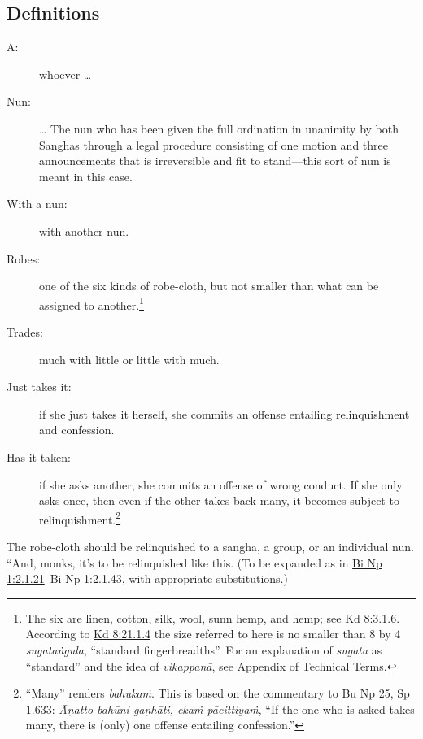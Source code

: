 \documentclass[12pt,openany]{book}%
\begin{document}
\subsection*{Definitions }

\begin{description}%
\item[A: ] whoever … %
\item[Nun: ] … The nun who has been given the full ordination in unanimity by both Sanghas through a legal procedure consisting of one motion and three announcements that is irreversible and fit to stand—this sort of nun is meant in this case. %
\item[With a nun: ] with another nun. %
\item[Robes: ] one of the six kinds of robe-cloth, but not smaller than what can be assigned to another.\footnote{The six are linen, cotton, silk, wool, sunn hemp, and hemp; see \href{https://suttacentral.net/pli-tv-kd8/en/brahmali\#3.1.6}{Kd 8:3.1.6}. According to \href{https://suttacentral.net/pli-tv-kd8/en/brahmali\#21.1.4}{Kd 8:21.1.4} the size referred to here is no smaller than 8 by 4 \textit{\textsanskrit{sugataṅgula}}, “standard fingerbreadths”. For an explanation of \textit{sugata} as “standard” and the idea of \textit{\textsanskrit{vikappanā}}, see Appendix of Technical Terms. } %
\item[Trades: ] much with little or little with much. %
\item[Just takes it: ] if she just takes it herself, she commits an offense entailing relinquishment and confession. %
\item[Has it taken: ] if she asks another, she commits an offense of wrong conduct. If she only asks once, then even if the other takes back many, it becomes subject to relinquishment.\footnote{“Many” renders \textit{\textsanskrit{bahukaṁ}}. This is based on the commentary to Bu Np 25, Sp 1.633: \textit{\textsanskrit{Āṇatto} \textsanskrit{bahūni} \textsanskrit{gaṇhāti}, \textsanskrit{ekaṁ} \textsanskrit{pācittiyaṁ}}, “If the one who is asked takes many, there is (only) one offense entailing confession.” } %
\end{description}

The robe-cloth should be relinquished to a sangha, a group, or an individual nun. “And, monks, it’s to be relinquished like this. (To be expanded as in \href{https://suttacentral.net/pli-tv-bi-vb-np1/en/brahmali\#2.1.21}{Bi Np 1:2.1.21}–Bi Np 1:2.1.43, with appropriate substitutions.) 
\end{document}
